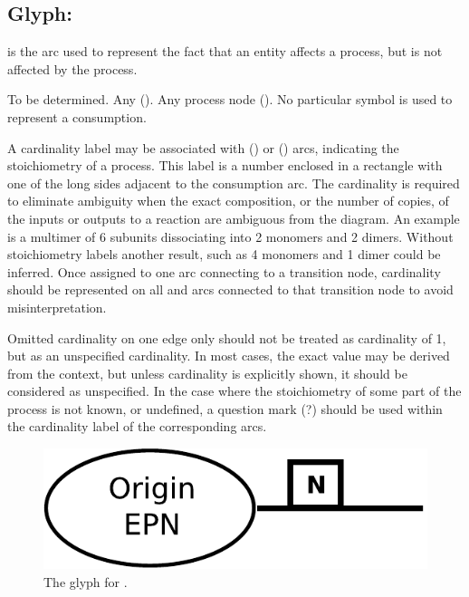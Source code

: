 

\subsection{Glyph: }
\label{sec:consumption}

 is the arc used to represent the fact that an entity affects a process,
but is not affected by the process.

\begin{glyphDescription}
 \glyphSboTerm To be determined.
 \glyphOrigin Any  ().
 \glyphTarget Any process node ().
 \glyphEndPoint No particular symbol is used to represent a consumption.
\end{glyphDescription}


A cardinality label may be associated with  () or 
 () arcs, indicating the stoichiometry of a process. This label is a number enclosed in a rectangle with one of the long sides adjacent to the consumption arc. The cardinality is 
required to eliminate ambiguity when the exact composition, or the number of 
copies, of the inputs or outputs to a reaction are ambiguous from the diagram. 
An example is a multimer of 6 subunits dissociating into 2 monomers and 2 
dimers. Without stoichiometry labels another result, such as 4 monomers and 1 
dimer could be inferred.
Once assigned to one arc connecting to a transition node, cardinality should be represented on
all  and  arcs connected to that transition
node to avoid misinterpretation.

Omitted cardinality on one edge only should not be treated as cardinality of 1, but
as an unspecified cardinality. In most cases, the exact value may be derived from the
context, but unless cardinality is explicitly shown, it should be considered as
unspecified. In the case where the stoichiometry of some part of the process is not
known, or undefined, a question mark (?) should be used within the cardinality label
of the corresponding arcs.

\begin{figure}[H]
  \centering
  \includegraphics[scale = 0.4]{images/consumption}
  \caption{The \PD glyph for .}
  \label{fig:consumption}
\end{figure}




